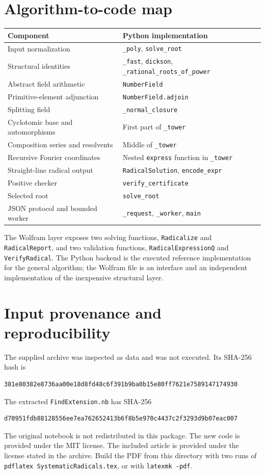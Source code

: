 \documentclass[11pt,a4paper]{article}
\theoremstyle{definition}
\theoremstyle{remark}
\newcommand{\code}[1]{\texttt{#1}}
\begin{document}
\section{Algorithm-to-code map}
\begin{center}\small
\begin{longtable}{@{}p{}p{}@{}}
\toprule
Component & Python implementation\\
\midrule
\endhead
Input normalization & \code{\_poly}, \code{solve\_root}\\
Structural identities & \code{\_fast}, \code{dickson}, \code{\_rational\_roots\_of\_power}\\
Abstract field arithmetic & \code{NumberField}\\
Primitive-element adjunction & \code{NumberField.adjoin}\\
Splitting field & \code{\_normal\_closure}\\
Cyclotomic base and automorphisms & First part of \code{\_tower}\\
Composition series and resolvents & Middle of \code{\_tower}\\
Recursive Fourier coordinates & Nested \code{express} function in \code{\_tower}\\
Straight-line radical output & \code{RadicalSolution}, \code{encode\_expr}\\
Positive checker & \code{verify\_certificate}\\
Selected root & \code{solve\_root}\\
JSON protocol and bounded worker & \code{\_request}, \code{\_worker}, \code{main}\\
\bottomrule
\end{longtable}
\end{center}
The Wolfram layer exposes two solving functions, \code{Radicalize} and
\code{RadicalReport}, and two validation functions, \code{RadicalExpressionQ}
and \code{VerifyRadical}.
The Python backend is the executed reference implementation for the general
algorithm; the Wolfram file is an interface and an independent implementation
of the inexpensive structural layer.

\section{Input provenance and reproducibility}
The supplied archive was inspected as data and was not executed. Its SHA-256
hash is
\begin{lstlisting}
381e80382e8736aa00e18d8fd48c6f391b9ba0b15e80ff7621e7589147174930
\end{lstlisting}
The extracted \code{FindExtension.nb} has SHA-256
\begin{lstlisting}
d70951fdb88128556ee7ea762652413b6f8b5e970c4437c2f3293d9b07eac007
\end{lstlisting}
The original notebook is not redistributed in this package. The new code is
provided under the MIT license. The included article is provided under the
license stated in the archive. Build the PDF from this directory with two runs
of \code{pdflatex SystematicRadicals.tex}, or with \code{latexmk -pdf}.
\end{document}
